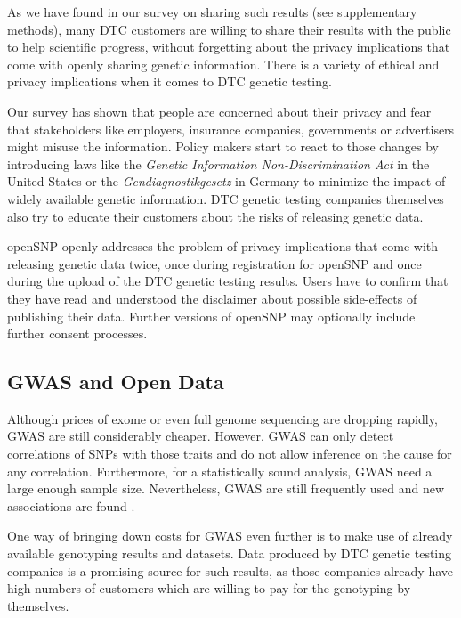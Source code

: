 \documentclass[10pt]{article}
\begin{document}
As we have found in our survey on sharing such results (see supplementary methods), many DTC customers are willing to share their results with the public to help scientific progress, without forgetting about the privacy implications that come with openly sharing genetic information. There is a variety of ethical and privacy implications when it comes to DTC genetic testing\cite{Caulfield2011,Joh2011}. 

Our survey has shown that people are concerned about their privacy and fear that stakeholders like employers, insurance companies, governments 
or advertisers might misuse the information. Policy makers start to react to those changes by introducing laws like the 
\textit{Genetic Information Non-Discrimination Act} in the United States or the \emph{Gendiagnostikgesetz} in Germany to minimize the impact of
widely available genetic information. DTC genetic testing companies themselves also try to educate their customers about the risks of releasing genetic data.  

openSNP openly addresses the problem of privacy implications that come with releasing genetic data twice, once during registration for openSNP and once during 
the upload of the DTC genetic testing results. Users have to confirm that they have read and understood the disclaimer about possible side-effects 
of publishing their data. Further versions of openSNP may optionally include further consent processes.

\subsection*{GWAS and Open Data}
Although prices of exome or even full genome sequencing are dropping rapidly, GWAS are still considerably cheaper. However, GWAS can only detect correlations of SNPs with those traits and do not allow 
inference on the cause for any correlation. Furthermore, for a statistically sound analysis, GWAS need a large enough sample size. Nevertheless, GWAS are still frequently used and new associations are found \cite{10.1371.journal.pone.0031470,10.1371.journal.pone.0030309,10.1371.journal.pone.0029848}. 

One way of bringing down costs for GWAS even further is to make use of already available genotyping results and datasets. 
Data produced by DTC genetic testing companies is a promising source for such results, as those companies already have high 
numbers of customers which are willing to pay for the genotyping by themselves.
\end{document}
